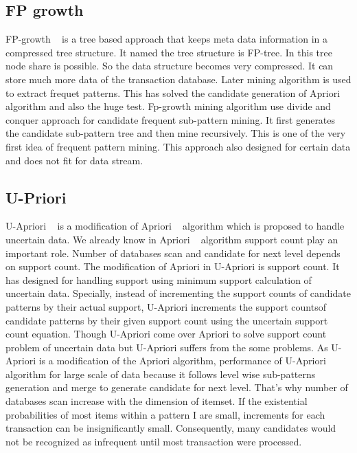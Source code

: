 	\subsection{FP growth }
	FP-growth ~\cite{fp_growth} is a tree based approach that keeps meta data information in a compressed tree structure. It named the tree structure is FP-tree. In this tree node share is possible. So the data structure becomes very compressed. It can store much more data of the transaction database. Later mining algorithm is used to extract frequet patterns. This has solved the candidate generation of Apriori ~\cite{apriori} algorithm and also the huge test. Fp-growth mining algorithm use divide and conquer approach for candidate frequent sub-pattern mining. It first generates the candidate sub-pattern tree and then mine recursively. This is one of the very first idea of frequent pattern mining. This approach also designed for certain data and does not fit for data stream.
	
	\subsection{U-Priori}
	U-Apriori ~\cite{u_priori} is a  modification of Apriori ~\cite{apriori} algorithm which is proposed to handle uncertain data. We already know in Apriori ~\cite{apriori} algorithm support count play an important role. Number of databases scan and candidate for next level depends on support count. The modification of Apriori in U-Apriori is support count. It has designed for handling support using minimum support calculation of uncertain data. Specially, instead of incrementing the support counts of candidate patterns by their actual support, U-Apriori increments the support countsof candidate patterns by their given support count using the uncertain support count equation. Though U-Apriori come over Apriori to solve support count problem of uncertain data but U-Apriori suffers from the some problems. As U-Apriori is a modification of the Apriori algorithm, performance of U-Apriori algorithm for large scale of data because it follows level wise sub-patterns generation and merge to generate candidate for next level. That's why number of databases scan increase with the dimension of itemset. If the existential probabilities of most items within a pattern I are small, increments for each transaction can be insignificantly small. Consequently, many candidates would not be recognized as infrequent until most transaction were processed.  
	

